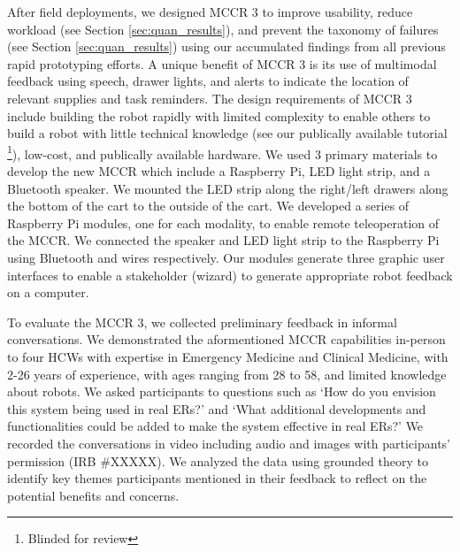After field deployments, we designed MCCR 3 to improve usability, reduce workload (see Section \ref{sec:quan_results}), and prevent the taxonomy of failures (see Section \ref{sec:quan_results}) using our accumulated findings from all previous rapid prototyping efforts.%
A unique benefit of MCCR 3 is its use of multimodal feedback using speech, drawer lights, and alerts to indicate the location of relevant supplies and task reminders.
The design requirements of MCCR 3 include building the robot rapidly with limited complexity to enable others to build a robot with little technical knowledge (see our publically available tutorial \footnote{Blinded for review}), low-cost, and publically available hardware.
We used 3 primary materials to develop the new MCCR which include a Raspberry Pi, LED light strip, and a  Bluetooth speaker.
We mounted the LED strip along the right/left drawers along the bottom of the cart to the outside of the cart.
We developed a series of Raspberry Pi modules, one for each modality, to enable remote teleoperation of the MCCR.
We connected the speaker and LED light strip to the Raspberry Pi using Bluetooth and wires respectively.
Our modules generate three graphic user interfaces to enable a stakeholder (wizard) to generate appropriate robot feedback on a computer.


To evaluate the MCCR 3, we collected preliminary feedback in informal conversations.
We demonstrated the aformentioned MCCR capabilities in-person to four HCWs with expertise in Emergency Medicine and Clinical Medicine, with 2-26 years of experience, with ages ranging from 28 to 58, and limited knowledge about robots. %
We asked participants to questions such as `How do you envision this system being used in real ERs?’ and `What additional developments and functionalities could be added to make the system effective in real ERs?’
We recorded the conversations in video including audio and images with participants' permission (IRB \#XXXXX).
We analyzed the data using grounded theory to identify key themes participants mentioned in their feedback to reflect on the potential benefits and concerns.


